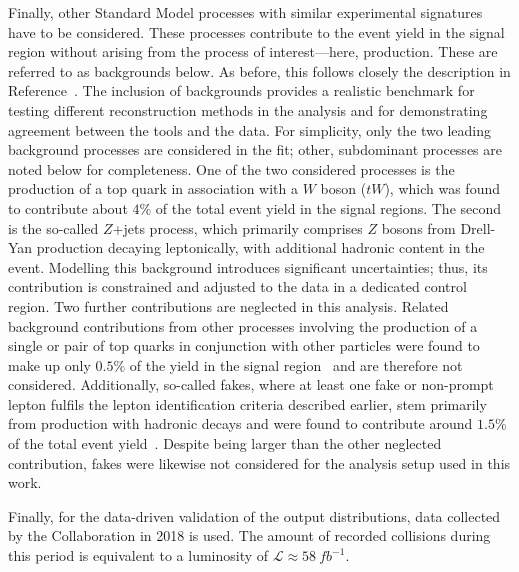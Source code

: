 Finally, other Standard Model processes with similar experimental signatures have to be considered. These processes contribute to the event yield in the signal region without arising from the process of interest—here, \ttbar production. These are referred to as backgrounds below. As before, this follows closely the description in Reference~\cite{atlas_toponium}. The inclusion of backgrounds provides a realistic benchmark for testing different reconstruction methods in the analysis and for demonstrating agreement between the tools and the data. For simplicity, only the two leading background processes are considered in the fit; other, subdominant processes are noted below for completeness.
One of the two considered processes is the production of a top quark in association with a $W$ boson ($tW$), which was found to contribute about $4\%$ of the total event yield in the signal regions. The second is the so-called $Z$+jets process, which primarily comprises $Z$ bosons from Drell-Yan production decaying leptonically, with additional hadronic content in the event. Modelling this background introduces significant uncertainties; thus, its contribution is constrained and adjusted to the data in a dedicated control region.
Two further contributions are neglected in this analysis. Related background contributions from other processes involving the production of a single or pair of top quarks in conjunction with other particles were found to make up only $0.5\%$ of the yield in the signal region~\cite{atlas_toponium} and are therefore not considered. Additionally, so-called fakes, where at least one fake or non-prompt lepton fulfils the lepton identification criteria described earlier, stem primarily from \ttbar production with hadronic decays and were found to contribute around $1.5\%$ of the total event yield~\cite{atlas_toponium}. Despite being larger than the other neglected contribution, fakes were likewise not considered for the analysis setup used in this work.

Finally, for the data-driven validation of the output distributions, data collected by the \atlas Collaboration in 2018 is used. The amount of recorded collisions during this period is equivalent to a luminosity of $\mathcal{L}\approx 58~\unit{fb^{-1}}$.

